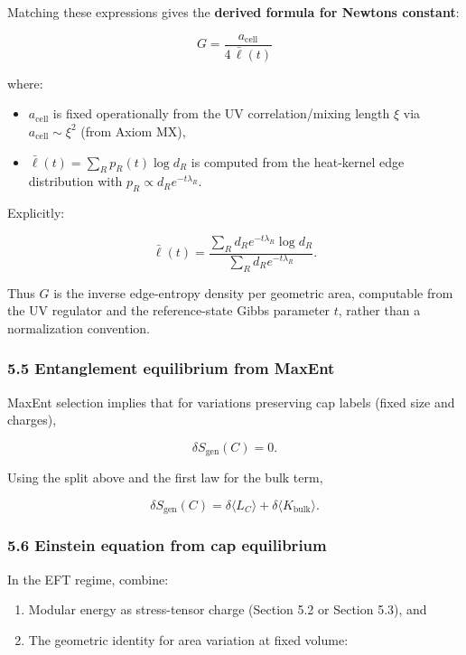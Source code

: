 Matching these expressions gives the \textbf{derived formula for Newton\textquotesingle s constant}:

\[
G = \frac{a_{\mathrm{cell}}}{4 \, \bar{\ell}(t)}
\]

where:

\begin{itemize}
\tightlist
\item
  \(a_{\mathrm{cell}}\) is fixed operationally from the UV correlation/mixing length \(\xi\) via \(a_{\mathrm{cell}} \sim \xi^2\) (from Axiom MX),
\item
  \(\bar{\ell}(t) = \sum_R p_R(t) \log d_R\) is computed from the heat-kernel edge distribution with \(p_R \propto d_R e^{-t\lambda_R}\).
\end{itemize}

Explicitly:

\[
\bar{\ell}(t) = \frac{\sum_R d_R e^{-t\lambda_R} \log d_R}{\sum_R d_R e^{-t\lambda_R}}.
\]

Thus \(G\) is the inverse edge-entropy density per geometric area, computable from the UV regulator and the reference-state Gibbs parameter \(t\), rather than a normalization convention.

\subsubsection{5.5 Entanglement equilibrium from MaxEnt}\label{55-entanglement-equilibrium-from-maxent}

MaxEnt selection implies that for variations preserving cap labels (fixed size and charges),

\[
\delta S_{\mathrm{gen}}(C) = 0.
\]

Using the split above and the first law for the bulk term,

\[
\delta S_{\mathrm{gen}}(C) = \delta \langle L_C \rangle + \delta \langle K_{\mathrm{bulk}} \rangle.
\]

\subsubsection{5.6 Einstein equation from cap equilibrium}\label{56-einstein-equation-from-cap-equilibrium}

In the EFT regime, combine:

\begin{enumerate}
\def\labelenumi{\arabic{enumi})}
\tightlist
\item
  Modular energy as stress-tensor charge (Section 5.2 or Section 5.3), and
\item
  The geometric identity for area variation at fixed volume:
\end{enumerate}

